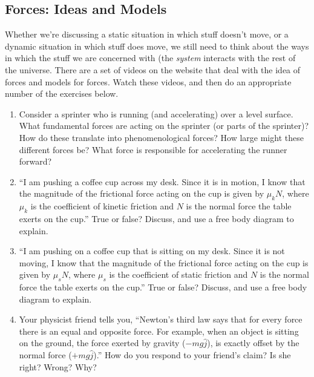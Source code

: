 \documentclass{tufte-handout}
\begin{document}
\begin{enumerate}
\section{Forces: Ideas and Models}


Whether we're discussing a static situation in which stuff doesn't move, or a dynamic situation in which stuff does move, we still need to think about the ways in which the stuff we are concerned with (the {\it system} interacts with the rest of the universe.  There are a set of videos on the website that deal with the idea of forces and models for forces.  Watch these videos, and then do an appropriate number of  the exercises below.



\begin{enumerate}[resume]
\item Consider a sprinter who is running (and accelerating) over a level surface.  What fundamental forces are acting on the sprinter (or parts of the sprinter)?  How do these translate into phenomenological forces?  How large might these different forces be?  What force is responsible for accelerating the runner forward?

\item ``I am pushing a coffee cup across my desk.  Since it is in motion, I know that the magnitude of the frictional force acting on the cup is given by $\mu_k N$, where $\mu_k$ is the coefficient of kinetic friction and $N$ is the normal force the table exerts on the cup.''  True or false?  Discuss, and use a free body diagram to explain.

\item ``I am pushing on a coffee cup that is sitting on my desk.  Since it is not moving, I know that the magnitude of the frictional force acting on the cup is given by $\mu_s N$, where $\mu_s$ is the coefficient of static friction and $N$ is the normal force the table exerts on the cup.''  True or false?  Discuss, and use a free body diagram to explain.

\item Your physicist friend tells you, ``Newton's third law says that for every force there is an equal and opposite force.  For example, when an object is sitting on the ground, the force exerted by gravity ($-mg \hat{j}$), is exactly offset by the normal force ($+mg \hat{j}$).''  How do you respond to your friend's claim?  Is she right?  Wrong?  Why?

%
%


\end{enumerate}
\end{enumerate}
\end{document}
